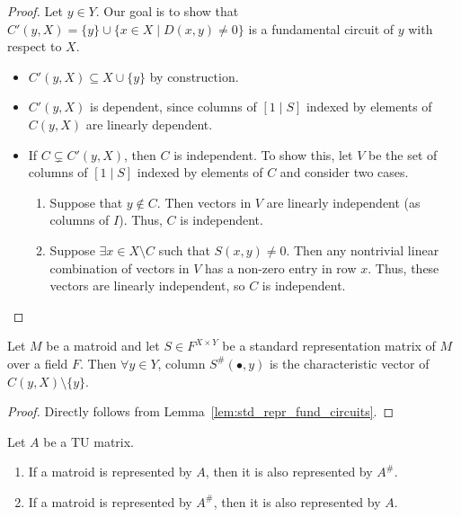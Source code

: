 \begin{proof}
    Let $y \in Y$. Our goal is to show that $C' (y, X) = \{y\} \cup \{x \in X \mid D (x, y) \neq 0\}$ is a fundamental circuit of $y$ with respect to $X$.
    \begin{itemize}
        \item $C' (y, X) \subseteq X \cup \{y\}$ by construction.
        \item $C' (y, X)$ is dependent, since columns of $[1 \mid S]$ indexed by elements of $C (y, X)$ are linearly dependent.
        \item If $C \subsetneq C' (y, X)$, then $C$ is independent. To show this, let $V$ be the set of columns of $[1 \mid S]$ indexed by elements of $C$ and consider two cases.
        \begin{enumerate}
            \item Suppose that $y \notin C$. Then vectors in $V$ are linearly independent (as columns of $I$). Thus, $C$ is independent.
            \item Suppose $\exists x \in X \setminus C$ such that $S (x, y) \neq 0$. Then any nontrivial linear combination of vectors in $V$ has a non-zero entry in row $x$. Thus, these vectors are linearly independent, so $C$ is independent.
        \end{enumerate}
    \end{itemize}
\end{proof}

\begin{lemma}
    \label{lem:std_repr_support_matrix_cols}
    Let $M$ be a matroid and let $S \in F^{X \times Y}$ be a standard representation matrix of $M$ over a field $F$. Then $\forall y \in Y$, column $S^{\#} (\bullet, y)$ is the characteristic vector of $C (y, X) \setminus \{y\}$.
\end{lemma}

\begin{proof}
    \uses{}
    Directly follows from Lemma~\ref{lem:std_repr_fund_circuits}.
\end{proof}

\begin{lemma}
    \label{Matrix.IsTotallyUnimodular.toMatroid_eq_support_toMatroid}
    \leanok
    Let $A$ be a TU matrix.
    \begin{enumerate}
        \item If a matroid is represented by $A$, then it is also represented by $A^{\#}$.
        \item If a matroid is represented by $A^{\#}$, then it is also represented by $A$.
    \end{enumerate}
\end{lemma}

